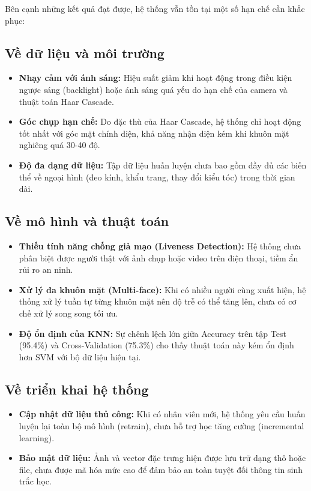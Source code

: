 \documentclass[a4paper]{book}
\begin{document}
Bên cạnh những kết quả đạt được, hệ thống vẫn tồn tại một số hạn chế cần khắc phục:

\subsection*{Về dữ liệu và môi trường}
\begin{itemize}
    \item \textbf{Nhạy cảm với ánh sáng:} Hiệu suất giảm khi hoạt động trong điều kiện ngược sáng (backlight) hoặc ánh sáng quá yếu do hạn chế của camera và thuật toán Haar Cascade.
    \item \textbf{Góc chụp hạn chế:} Do đặc thù của Haar Cascade, hệ thống chỉ hoạt động tốt nhất với góc mặt chính diện, khả năng nhận diện kém khi khuôn mặt nghiêng quá 30-40 độ.
    \item \textbf{Độ đa dạng dữ liệu:} Tập dữ liệu huấn luyện chưa bao gồm đầy đủ các biến thể về ngoại hình (đeo kính, khẩu trang, thay đổi kiểu tóc) trong thời gian dài.
\end{itemize}

\subsection*{Về mô hình và thuật toán}
\begin{itemize}
    \item \textbf{Thiếu tính năng chống giả mạo (Liveness Detection):} Hệ thống chưa phân biệt được người thật với ảnh chụp hoặc video trên điện thoại, tiềm ẩn rủi ro an ninh.
    \item \textbf{Xử lý đa khuôn mặt (Multi-face):} Khi có nhiều người cùng xuất hiện, hệ thống xử lý tuần tự từng khuôn mặt nên độ trễ có thể tăng lên, chưa có cơ chế xử lý song song tối ưu.
    \item \textbf{Độ ổn định của KNN:} Sự chênh lệch lớn giữa Accuracy trên tập Test (95.4\%) và Cross-Validation (75.3\%) cho thấy thuật toán này kém ổn định hơn SVM với bộ dữ liệu hiện tại.
\end{itemize}

\subsection*{Về triển khai hệ thống}
\begin{itemize}
    \item \textbf{Cập nhật dữ liệu thủ công:} Khi có nhân viên mới, hệ thống yêu cầu huấn luyện lại toàn bộ mô hình (retrain), chưa hỗ trợ học tăng cường (incremental learning).
    \item \textbf{Bảo mật dữ liệu:} Ảnh và vector đặc trưng hiện được lưu trữ dạng thô hoặc file, chưa được mã hóa mức cao để đảm bảo an toàn tuyệt đối thông tin sinh trắc học.
\end{itemize}
\end{document}
